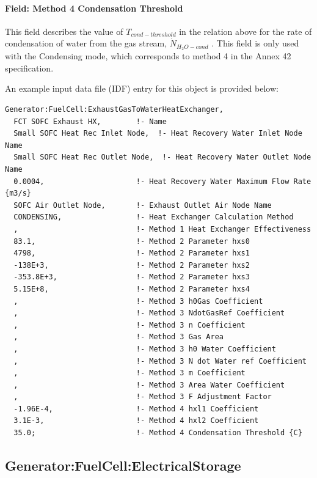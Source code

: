 \paragraph{Field: Method 4 Condensation Threshold}\label{field-method-4-condensation-threshold}

This field describes the value of \({T_{cond - threshold}}\) in the relation above for the rate of condensation of water from the gas stream, \({\dot N_{{H_2}O - cond}}\) . This field is only used with the Condensing mode, which corresponds to method 4 in the Annex 42 specification.

An example input data file (IDF) entry for this object is provided below:

\begin{lstlisting}
Generator:FuelCell:ExhaustGasToWaterHeatExchanger,
  FCT SOFC Exhaust HX,        !- Name
  Small SOFC Heat Rec Inlet Node,  !- Heat Recovery Water Inlet Node Name
  Small SOFC Heat Rec Outlet Node,  !- Heat Recovery Water Outlet Node Name
  0.0004,                     !- Heat Recovery Water Maximum Flow Rate {m3/s}
  SOFC Air Outlet Node,       !- Exhaust Outlet Air Node Name
  CONDENSING,                 !- Heat Exchanger Calculation Method
  ,                           !- Method 1 Heat Exchanger Effectiveness
  83.1,                       !- Method 2 Parameter hxs0
  4798,                       !- Method 2 Parameter hxs1
  -138E+3,                    !- Method 2 Parameter hxs2
  -353.8E+3,                  !- Method 2 Parameter hxs3
  5.15E+8,                    !- Method 2 Parameter hxs4
  ,                           !- Method 3 h0Gas Coefficient
  ,                           !- Method 3 NdotGasRef Coefficient
  ,                           !- Method 3 n Coefficient
  ,                           !- Method 3 Gas Area
  ,                           !- Method 3 h0 Water Coefficient
  ,                           !- Method 3 N dot Water ref Coefficient
  ,                           !- Method 3 m Coefficient
  ,                           !- Method 3 Area Water Coefficient
  ,                           !- Method 3 F Adjustment Factor
  -1.96E-4,                   !- Method 4 hxl1 Coefficient
  3.1E-3,                     !- Method 4 hxl2 Coefficient
  35.0;                       !- Method 4 Condensation Threshold {C}
\end{lstlisting}

\subsection{Generator:FuelCell:ElectricalStorage}\label{generatorfuelcellelectricalstorage}

